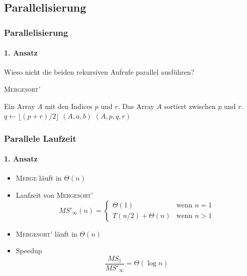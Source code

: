 \subsection{Parallelisierung}
\begin{frame}
    \frametitle{Parallelisierung}
    \framesubtitle{1. Ansatz}
    Wieso nicht die beiden rekursiven Aufrufe parallel ausführen?
    \begin{algorithm}[H]
        \caption{{\rmfamily \textsc{Mergesort'}} \cite[S.34]{cormen}}
        \label{alg:mergesort}
        \begin{algorithmic}[1]
            \Require Ein Array $A$ mit den Indices $p$ und $r$.
            \Ensure Das Array $A$ sortiert zwischen $p$ und $r$.
                \State $q \gets \lfloor (p + r) / 2 \rfloor$
                    $(A, a, b)$
                \EndParDo
                $(A, p, q, r)$
            \EndIf
        \end{algorithmic}
    \end{algorithm}
\end{frame}

\begin{frame}
    \frametitle{Parallele Laufzeit}
    \framesubtitle{1. Ansatz}
    \begin{itemize}
        \item {\rmfamily \textsc{Merge}} läuft in $\Theta(n)$
        \item Laufzeit von {\rmfamily \textsc{Mergesort'}}
            \begin{equation}
                MS'_\infty(n) = \begin{cases}
                    \Theta(1) & \text{wenn } n = 1 \\
                    T(n/2) + \Theta(n) & \text{wenn } n > 1
                \end{cases}
            \end{equation}
        \item {\rmfamily \textsc{Mergesort'}} läuft in $\Theta(n)$
        \item Speedup
            \begin{equation}
                \frac{MS_1}{MS'_\infty} = \Theta(\log n)
            \end{equation}
    \end{itemize}
\end{frame}
